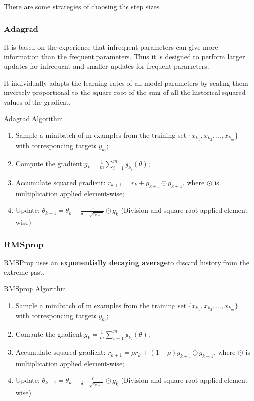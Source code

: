 \documentclass[11pt]{article} %
\begin{document}
There are some strategies of choosing the step sizes.

\subsubsection{Adagrad}
It is based on the experience that infrequent parameters can give more information than the frequent parameters.
Thus it is designed to perform larger updates for infrequent and smaller updates for frequent parameters.

It individually adapts the learning rates of all model parameters by scaling them inversely proportional to the square root of the sum of all the historical squared values of the gradient.
\begin{algorithm}[htb]
\caption{Adagrad Algorithm}
\label{Adagrad}

  \begin{enumerate}
  \item Sample a minibatch of m examples from the training set $\{x_{k_1}, x_{k_2}, \dots, x_{k_m}\}$ with corresponding targets $y_{k_i}$;
  \item Compute the gradient:$g_{k} = \frac{1}{m}\sum_{i=1}^{m}g_{k_{i}}({\theta})$;
  \item Accumulate squared gradient: $r_{k+1}= r_k+ g_{k+1}\odot g_{k+1}$, where $\odot$ is multiplication applied element-wise;
  \item Update: ${\theta}_{k+1}={\theta}_k - \frac{\varepsilon}{\delta + \sqrt{r_{k+1}}}\odot g_k$ (Division and square root applied element-wise).
\end{enumerate}
\end{algorithm}

\subsubsection{RMSprop}

RMSProp uses an \textbf{exponentially decaying average}to discard history from the extreme past.
\begin{algorithm}[htb]
\caption{RMSprop Algorithm}
\label{RMSprop}
  \begin{enumerate}
  \item Sample a minibatch of m examples from the training set $\{x_{k_1}, x_{k_2}, \dots, x_{k_m}\}$ with corresponding targets $y_{k_i}$;
  \item Compute the gradient:$g_{k} = \frac{1}{m}\sum_{i=1}^{m}g_{k_{i}}({\theta})$;
  \item Accumulate squared gradient: $r_{k+1}= \rho r_k+(1-\rho)g_{k+1}\odot g_{k+1}$, where $\odot$ is multiplication applied element-wise;
  \item Update: ${\theta}_{k+1}={\theta}_k - \frac{\varepsilon}{\delta + \sqrt{r_{k+1}}}\odot g_k$ (Division and square root applied element-wise).
\end{enumerate}

\end{algorithm}
\end{document}
